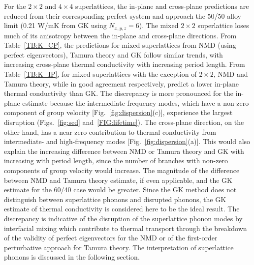 For the $2\times 2$ and $4\times 4$ superlattices, the in-plane and cross-plane predictions are reduced from their corresponding perfect system and approach the 50/50 alloy limit (0.21 W/mK from GK using $N_{x,y,z}=6$). The mixed $2\times 2$ superlattice loses much of its anisotropy between the in-plane and cross-plane directions. From Table~\ref{TB:K_CP}, the predictions for mixed superlattices from NMD (using perfect eigenvectors), Tamura theory and GK follow similar trends, with increasing cross-plane thermal conductivity with increasing period length. From Table~\ref{TB:K_IP}, for mixed superlattices with the exception of $2 \times 2$, NMD and Tamura theory, while in good agreement respectively,  predict a lower in-plane thermal conductivity than GK. The discrepancy is more pronounced for the in-plane estimate because the intermediate-frequency modes, which have a non-zero component of group velocity [Fig.~\ref{fig:dispersion}(c)], experience the largest disruption (Figs.~\ref{fig:sed} and~\ref{FIG:lifetime}). The cross-plane direction, on the other hand, has a near-zero contribution to thermal conductivity from intermediate- and high-frequency modes [Fig.~\ref{fig:dispersion}(a)]. This would also explain the increasing difference between NMD or Tamura theory and GK with increasing with period length, since the number of branches with non-zero components of group velocity would increase. The magnitude of the difference between NMD and Tamura theory estimate, if even applicable, and the GK estimate for the 60/40 case would be greater. Since the GK method does not distinguish between superlattice phonons and disrupted phonons, the GK estimate of thermal conductivity is considered here to be the ideal result. The discrepancy is indicative of the disruption of the superlattice phonon modes by interfacial mixing which contribute to thermal transport through the breakdown of the validity of perfect eigenvectors for the NMD or of the first-order perturbative approach for Tamura theory. The interpretation of superlattice phonons is discussed in the following section.

